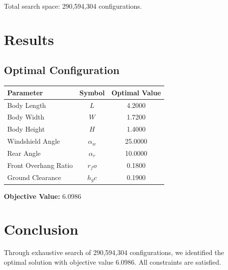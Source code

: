 \documentclass[11pt,a4paper]{article}
\begin{document}
Total search space: 290,594,304 configurations.

\section{Results}

\subsection{Optimal Configuration}

\begin{center}
\begin{tabular}{|l|c|c|}
\hline
Parameter & Symbol & Optimal Value \\
\hline
Body Length & $L$ & 4.2000 \\
Body Width & $W$ & 1.7200 \\
Body Height & $H$ & 1.4000 \\
Windshield Angle & $α_w$ & 25.0000 \\
Rear Angle & $α_r$ & 10.0000 \\
Front Overhang Ratio & $r_fo$ & 0.1800 \\
Ground Clearance & $h_gc$ & 0.1900 \\
\hline
\end{tabular}
\end{center}

\textbf{Objective Value:} 6.0986

\section{Conclusion}

Through exhaustive search of 290,594,304 configurations, we identified the optimal solution with objective value 6.0986. All constraints are satisfied.
\end{document}
